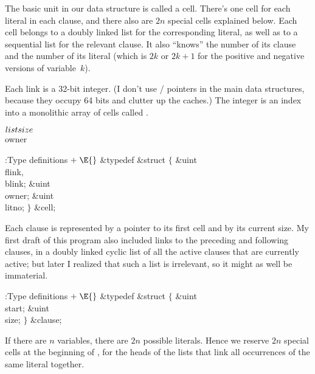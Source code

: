 The basic unit in our data structure is called a cell.
There's one
cell for each literal in each clause, and there also are $2n$ special
cells explained below. Each cell belongs to a doubly linked
list for the corresponding literal, as well as to a sequential list
for the relevant clause. It also ``knows'' the number of its clause
and the number of its literal (which is $2k$ or $2k+1$ for the
positive and negative versions of variable~$k$).

Each link is a 32-bit integer. (I don't use \CEE/ pointers in the main
data structures, because they occupy 64 bits and clutter up the caches.)
The integer is an index into a monolithic array of cells called .

\Y\B\4\D$\\{listsize}$ \5
\\{owner}\par
\Y\B\4:Type definitions\X${}\mathrel+\E{}$\6
\&{typedef} \&{struct} ${}\{{}$\1\6
\&{uint} \\{flink}${},{}$ \\{blink};\6
\&{uint} \\{owner};\6
\&{uint} \\{litno};\2\6
${}\}{}$ \&{cell};\par
\fi

Each clause is represented by a pointer to its first cell and
by its
current size. My first draft of this program also included links to the
preceding and following clauses, in a doubly linked cyclic list
of all the active clauses that are currently active; but later I realized
that such a list is irrelevant, so it might as well be immaterial.

\Y\B\4:Type definitions\X${}\mathrel+\E{}$\6
\&{typedef} \&{struct} ${}\{{}$\1\6
\&{uint} \\{start};\6
\&{uint} \\{size};\2\6
${}\}{}$ \&{clause};\par
\fi

If there are $n$ variables, there are $2n$ possible literals.
Hence we
reserve $2n$ special cells at the beginning of , for the heads of
the lists that link all occurrences of the same literal together.

